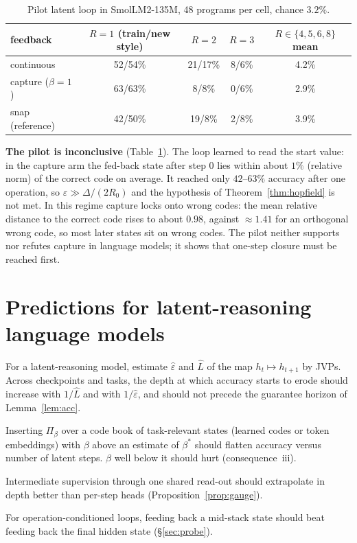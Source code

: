 \documentclass[11pt]{article}
\theoremstyle{definition}
\theoremstyle{remark}
\begin{document}
\begin{table}[t]\centering\small
\begin{tabular}{@{}lcccc@{}}\toprule
feedback & $R=1$ (train/new style) & $R=2$ & $R=3$ & $R\in\{4,5,6,8\}$ mean\\\midrule
continuous & 52/54\% & 21/17\% & 8/6\% & 4.2\%\\
capture ($\beta=1$) & 63/63\% & 8/8\% & 0/6\% & 2.9\%\\
snap (reference) & 42/50\% & 19/8\% & 2/8\% & 3.9\%\\\bottomrule
\end{tabular}
\caption{Pilot latent loop in SmolLM2-135M, 48 programs per cell, chance $3.2\%$.}\label{tab:pilot}
\end{table}

\textbf{The pilot is inconclusive} (Table~\ref{tab:pilot}). The loop learned to read the start
value: in the capture arm the fed-back state after step 0 lies within about $1\%$ (relative norm)
of the correct code on average. It reached only $42$--$63\%$ accuracy after one operation, so $\varepsilon\gg\Delta/(2R_0)$
and the hypothesis of Theorem~\ref{thm:hopfield} is not met. In this regime capture locks onto
wrong codes: the mean relative distance to the correct code rises to about $0.98$, against
$\approx1.41$ for an orthogonal wrong code, so most later states sit on wrong codes.
The pilot neither supports nor refutes capture in language models; it shows that one-step
closure must be reached first.

\section{Predictions for latent-reasoning language models}\label{sec:predictions}

\begin{description}[leftmargin=1.2em,itemsep=2pt]
\item[P1 (gain predicts erosion).] For a latent-reasoning model, estimate $\hat\varepsilon$ and
$\hat L$ of the map $h_t\mapsto h_{t+1}$ by JVPs. Across checkpoints and tasks, the depth at which
accuracy starts to erode should increase with $1/\hat L$ and with $1/\hat\varepsilon$, and should not
precede the guarantee horizon of Lemma~\ref{lem:acc}.
\item[P2 (capture flattens depth curves).] Inserting $\Pi_\beta$ over a code book of
task-relevant states (learned codes or token embeddings) with $\beta$ above an estimate of
$\beta^*$ should flatten accuracy versus number of latent steps. $\beta$ well below it should
hurt (consequence~iii).
\item[P3 (shared read-out).] Intermediate supervision through one shared read-out should
extrapolate in depth better than per-step heads (Proposition~\ref{prop:gauge}).
\item[P4 (tap depth).] For operation-conditioned loops, feeding back a mid-stack state should beat
feeding back the final hidden state (\S\ref{sec:probe}).
\end{description}
\end{document}

